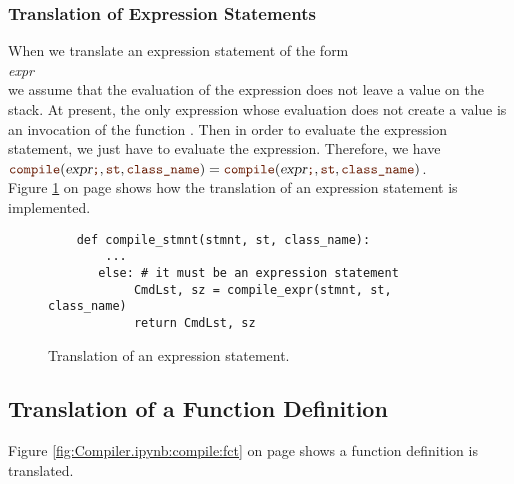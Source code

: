 \subsubsection{Translation of Expression Statements}
When we translate an expression statement of the form
\\[0.2cm]
\hspace*{1.3cm}
\textsl{expr} \mytt{;}
\\[0.2cm]
we assume that the evaluation of the expression does not leave a value on the stack.
At present, the only expression whose evaluation does not create a value is an invocation of the function
.  Then in order to evaluate the expression statement, we just have to evaluate the expression.
Therefore, we have
\\[0.2cm]
\hspace*{1.3cm}
$\mytt{compile}(\textsl{expr}\mytt{;}, \mytt{st}, \mytt{class\_name})
=  \mytt{compile}(\textsl{expr}\mytt{;}, \mytt{st}, \mytt{class\_name})$.
\\[0.2cm]
Figure \ref{fig:Compiler.ipynb:compile:expr_stmnt} on page \pageref{fig:Compiler.ipynb:compile:expr_stmnt} shows how the
translation of an expression statement is implemented.

\begin{figure}[!ht]
\centering
\begin{verbatim}
    def compile_stmnt(stmnt, st, class_name):
        ...
       else: # it must be an expression statement
            CmdLst, sz = compile_expr(stmnt, st, class_name)
            return CmdLst, sz
\end{verbatim}
\vspace*{-0.3cm}
\caption{Translation of an expression statement.}
\label{fig:Compiler.ipynb:compile:expr_stmnt}
\end{figure}


\subsection{Translation of a Function Definition}
Figure \ref{fig:Compiler.ipynb:compile:fct} on page \pageref{fig:Compiler.ipynb:compile:fct} shows a
function definition is translated.  

